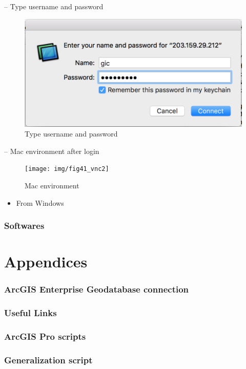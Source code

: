 \documentclass[]{book}
\providecommand{\tightlist}{%
  \setlength{\itemsep}{0pt}\setlength{\parskip}{0pt}}
\begin{document}
-- Type username and password

\begin{figure}

{\centering \includegraphics[width=0.7\linewidth]{img/fig41_vnc1} 

}

\caption{Type username and password}\label{fig:fig41b}
\end{figure}

-- Mac environment after login

\begin{figure}

{\centering \texttt{[image: img/fig41\_vnc2]} 

}

\caption{Mac environment}\label{fig:fig41c}
\end{figure}

\begin{itemize}
\tightlist
\item
  From Windows
\end{itemize}

\subsection{Softwares}\label{softwares-2}

\chapter*{Appendices}\label{appendices}

\subsection*{ArcGIS Enterprise Geodatabase
connection}\label{arcgis-enterprise-geodatabase-connection}

\subsection*{Useful Links}\label{useful-links}

\subsection*{ArcGIS Pro scripts}\label{arcgis-pro-scripts}

\subsection*{Generalization script}\label{generalization-script}


\end{document}
